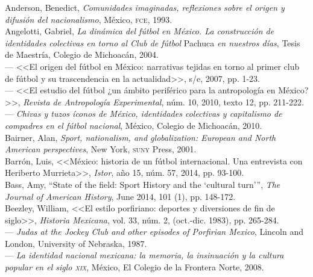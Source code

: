 \documentclass[11pt,a5paper,twoside]{book} %
\begin{document}
\begin{hangparas}{1cm}{1}
\noindent Anderson, Benedict, \emph{Comunidades imaginadas, reflexiones sobre el origen y difusión del nacionalismo}, México, \textsc{fce}, 1993. \\

\noindent Angelotti, Gabriel, \emph{La dinámica del fútbol en México. La construcción de identidades colectivas en torno al Club de fútbol} Pachuca \emph{en nuestros días}, Tesis de Maestría, Colegio de Michoacán, 2004. \\

\noindent --- <<El origen del fútbol en México: narrativas tejidas en torno al primer club de fútbol y su trascendencia en la actualidad>>, s/e, 2007, pp. 1-23. \\

\noindent --- <<El estudio del fútbol ¿un ámbito periférico para la antropología en
México?>>, \emph{Revista de Antropología Experimental}, núm. 10, 2010, texto 12, pp. 211-222. \\

\noindent --- \emph{Chivas y tuzos íconos de México, identidades colectivas y capitalismo de compadres en el fútbol nacional}, México, Colegio de Michoacán, 2010. \\

\noindent Bairner, Alan, \emph{Sport, nationalism, and globalization: European and North American perspectives}, New York, \textsc{suny} Press, 2001. \\

\noindent Barrón, Luis, <<México: historia de un fútbol internacional. Una entrevista con Heriberto Murrieta>>, \emph{Istor}, año 15, núm. 57, 2014, pp. 93-100. \\

\noindent Bass, Amy, “State of the field: Sport History and the ‘cultural turn’”, \emph{The Journal of American History}, June 2014, 101 (1), pp. 148-172. \\

\noindent Beezley, William, <<El estilo porfiriano: deportes y diversiones de fin de siglo>>, \emph{Historia Mexicana}, vol. 33, núm. 2, (oct.-dic. 1983), pp. 265-284. \\

\noindent --- \emph{Judas at the Jockey Club and other episodes of Porfirian Mexico}, Lincoln and London, University of Nebraska, 1987. \\

\noindent --- \emph{La identidad nacional mexicana: la memoria, la insinuación y la cultura popular en el siglo \textsc{xix}}, México, El Colegio de la Frontera Norte, 2008. \\


\end{hangparas}
\end{document}
